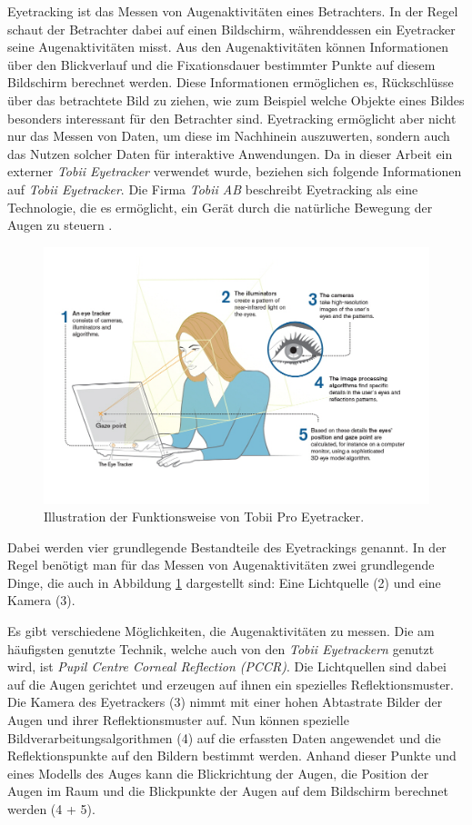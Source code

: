 Eyetracking ist das Messen von Augenaktivitäten eines Betrachters.
In der Regel schaut der Betrachter dabei auf einen Bildschirm, währenddessen ein Eyetracker seine Augenaktivitäten misst.
Aus den Augenaktivitäten können Informationen über den Blickverlauf und die Fixationsdauer bestimmter Punkte auf diesem Bildschirm berechnet werden.
Diese Informationen ermöglichen es, Rückschlüsse über das betrachtete Bild zu ziehen, wie zum Beispiel welche Objekte eines Bildes besonders interessant für den Betrachter sind.
Eyetracking ermöglicht aber nicht nur das Messen von Daten, um diese im Nachhinein auszuwerten, sondern auch das Nutzen solcher Daten für interaktive Anwendungen.
Da in dieser Arbeit ein externer \emph{Tobii Eyetracker} verwendet wurde, beziehen sich folgende Informationen auf \emph{Tobii Eyetracker}.
Die Firma \emph{Tobii AB} beschreibt Eyetracking als eine Technologie, die es ermöglicht, ein Gerät durch die natürliche Bewegung der Augen zu steuern \cite{tobii}.
\begin{figure}
	\centering
	\includegraphics[width=1\textwidth]{../../Grafiken/How-20DoesEyetrackingWork_ScreenBased.jpg}
	\caption{Illustration der Funktionsweise von Tobii Pro Eyetracker. \cite{tobiipro}}
	\label{fig::et01}
\end{figure}
Dabei werden vier grundlegende Bestandteile des Eyetrackings genannt.
In der Regel benötigt man für das Messen von Augenaktivitäten zwei grundlegende Dinge, die auch in Abbildung \ref{fig::et01} dargestellt sind: Eine Lichtquelle (2) und eine Kamera (3).

Es gibt verschiedene Möglichkeiten, die Augenaktivitäten zu messen.
Die am häufigsten genutzte Technik, welche auch von den \emph{Tobii Eyetrackern} genutzt wird, ist \emph{Pupil Centre Corneal Reflection (PCCR)}.
Die Lichtquellen sind dabei auf die Augen gerichtet und erzeugen auf ihnen ein spezielles Reflektionsmuster.
Die Kamera des Eyetrackers (3) nimmt mit einer hohen Abtastrate Bilder der Augen und ihrer Reflektionsmuster auf.
Nun können spezielle Bildverarbeitungsalgorithmen (4) auf die erfassten Daten angewendet und die Reflektionspunkte auf den Bildern bestimmt werden.
Anhand dieser Punkte und eines Modells des Auges kann die Blickrichtung der Augen, die Position der Augen im Raum und die Blickpunkte der Augen auf dem Bildschirm berechnet werden (4 + 5).

